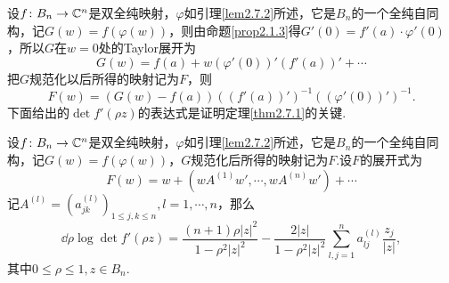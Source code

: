 设$f\colon B_n\to\mathbb C^n$是双全纯映射，$\varphi$如引理\ref{lem2.7.2}所述，它是$B_n$的一个全纯自同构，记$G(w)=f(\varphi(w))$，则由命题\ref{prop2.1.3}得$G'(0)=f'(a)\cdot\varphi'(0)$，所以$G$在$w=0$处的Taylor展开为
\[G(w)=f(a)+w(\varphi'(0))'(f'(a))'+\cdots\]
把$G$规范化以后所得的映射记为$F$，则
\[F(w)=(G(w)-f(a))((f'(a))')^{-1}((\varphi'(0))')^{-1}.\]
下面给出的$\det f'(\rho z)$的表达式是证明定理\ref{thm2.7.1}的关键.
\begin{lemma}\label{lem2.7.3}
	设$f\colon B_n\to\mathbb C^n$是双全纯映射，$\varphi$如引理\ref{lem2.7.2}所述，它是$B_n$的一个全纯自同构，记$G(w)=f(\varphi(w))$，$G$规范化后所得的映射记为$F$.设$F$的展开式为
	\begin{equation}\label{eq2.7.4}
		F(w)=w+(wA^{(1)}w',\cdots,wA^{(n)}w')+\cdots
	\end{equation}
记$A^{(l)}=(a_{jk}^{(l)})_{1\le j,k\le n},l=1,\cdots,n$，那么
\begin{equation}\label{eq2.7.5}
	\dd{}{\rho}\log\det f'(\rho z)
	=\frac{(n+1)\rho|z|^2}{1-\rho^2|z|^2}-\frac{2|z|}{1-\rho^2|z|^2}\sum_{l,j=1}^{n}a_{lj}^{(l)}\frac{z_j}{|z|},
\end{equation}
其中$0\le\rho\le1,z\in B_n$.
\end{lemma}
